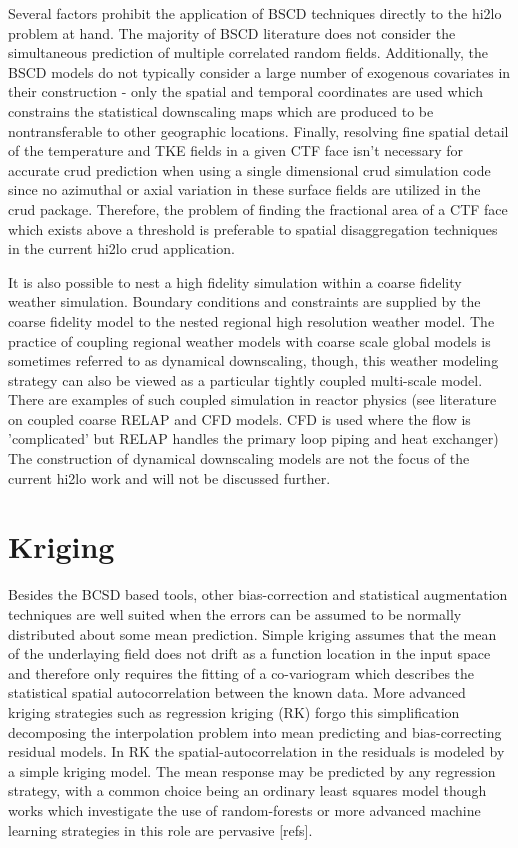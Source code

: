 
Several factors prohibit the application of BSCD techniques directly to the hi2lo problem at hand.  The majority of BSCD literature does not consider the simultaneous prediction of multiple correlated random fields.  Additionally, the BSCD models do not typically consider a large number of exogenous covariates in their construction - only the spatial and temporal coordinates are used which constrains the statistical downscaling maps which are produced to be nontransferable to other geographic locations.  Finally, resolving fine spatial detail of the temperature and TKE fields in a given CTF face isn't necessary for accurate crud prediction when using a single dimensional crud simulation code since no azimuthal or axial variation in these surface fields are utilized in the crud package.  Therefore, the problem of finding the fractional area of a CTF face which exists above a threshold is preferable to spatial disaggregation techniques in the current hi2lo crud application.

It is also possible to nest a high fidelity simulation within a coarse fidelity weather simulation. Boundary conditions and constraints are supplied by the coarse fidelity model to the nested regional high resolution weather model.  The practice of coupling regional weather models with coarse scale global models is sometimes referred to as dynamical downscaling, though, this weather modeling strategy can also be viewed as a particular tightly coupled multi-scale model.  There are examples of such coupled simulation in reactor physics (see literature on coupled coarse RELAP and CFD models.  CFD is used where the flow is 'complicated' but RELAP handles the primary loop piping and heat exchanger)  The construction of dynamical downscaling models are not the focus of the current hi2lo work and will not be discussed further.

\section{Kriging}

Besides the BCSD based tools, other bias-correction and statistical augmentation techniques are well suited when the errors can be assumed to be normally distributed about some mean prediction.  Simple kriging assumes that the mean of the underlaying field does not drift as a function location in the input space and therefore only requires the fitting of a co-variogram which describes the statistical spatial autocorrelation between the known data.  More advanced kriging strategies such as regression kriging (RK) forgo this simplification decomposing the interpolation problem into mean predicting and bias-correcting residual models.  In RK the spatial-autocorrelation in the residuals is modeled by a simple kriging model.  The mean response may be predicted by any regression strategy, with a common choice being an ordinary least squares model though works which investigate the use of random-forests or more advanced machine learning strategies in this role are pervasive [refs].

